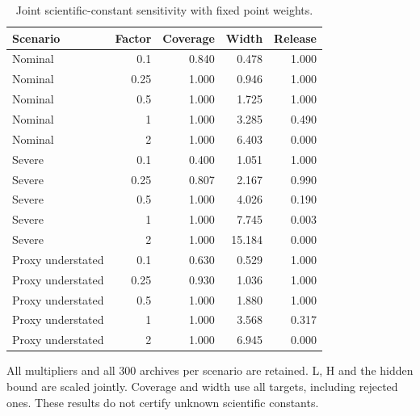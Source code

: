 \begin{table}[htbp]
\centering\small
\setlength{\tabcolsep}{4pt}
\caption{Joint scientific-constant sensitivity with fixed point weights.}
\label{tab:b-constants}
\begin{tabular}{lrrrr}
\toprule
Scenario & Factor & Coverage & Width & Release \\
\midrule
Nominal & 0.1 & 0.840 & 0.478 & 1.000 \\
Nominal & 0.25 & 1.000 & 0.946 & 1.000 \\
Nominal & 0.5 & 1.000 & 1.725 & 1.000 \\
Nominal & 1 & 1.000 & 3.285 & 0.490 \\
Nominal & 2 & 1.000 & 6.403 & 0.000 \\
Severe & 0.1 & 0.400 & 1.051 & 1.000 \\
Severe & 0.25 & 0.807 & 2.167 & 0.990 \\
Severe & 0.5 & 1.000 & 4.026 & 0.190 \\
Severe & 1 & 1.000 & 7.745 & 0.003 \\
Severe & 2 & 1.000 & 15.184 & 0.000 \\
Proxy understated & 0.1 & 0.630 & 0.529 & 1.000 \\
Proxy understated & 0.25 & 0.930 & 1.036 & 1.000 \\
Proxy understated & 0.5 & 1.000 & 1.880 & 1.000 \\
Proxy understated & 1 & 1.000 & 3.568 & 0.317 \\
Proxy understated & 2 & 1.000 & 6.945 & 0.000 \\
\bottomrule
\end{tabular}
\par\smallskip\begin{minipage}{0.97\linewidth}\footnotesize All multipliers and all 300 archives per scenario are retained. L, H and the hidden bound are scaled jointly. Coverage and width use all targets, including rejected ones. These results do not certify unknown scientific constants.\end{minipage}
\end{table}
